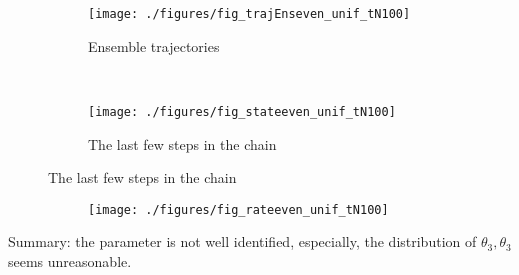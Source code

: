 \documentclass[12pt]{article}
\begin{document}
\begin{figure}[h!]
  \caption{State estimation} \label{fig:traj} \vspace{-4mm}
    \centering
    \hspace{-20mm}
    \begin{subfigure}[b]{0.45\textwidth}
        \texttt{[image: ./figures/fig\_trajEnseven\_unif\_tN100]}
        \caption{Ensemble trajectories}
        \label{fig:gull}
    \end{subfigure}
    ~ %
    \begin{subfigure}[b]{0.45\textwidth}
        \texttt{[image: ./figures/fig\_stateeven\_unif\_tN100]}
          \caption{The last few steps in the chain}
        \label{fig:tiger}
    \end{subfigure}
\end{figure}

\begin{figure}[h!]
   \caption{Update rate}\label{fig:traj} \vspace{-2mm}
    \centering
    \hspace{-20mm}
    \begin{subfigure}[b]{0.45\textwidth}       %
        \texttt{[image: ./figures/fig\_rateeven\_unif\_tN100]} %
        \label{fig:gull}
    \end{subfigure}
\end{figure}

Summary: the parameter is not well identified, especially, the distribution of $\theta_3, \theta_3$ seems unreasonable.  


\newpage
\end{document}
